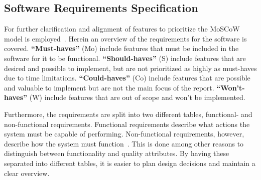 \subsection{Software Requirements Specification}\label{subsec:software-requirements-specification}

For further clarification and alignment of features to prioritize the MoSCoW model is employed~\cite{hudaib2018}.
Herein an overview of the requirements for the software is covered.
\textbf{``Must-haves''} (Mo) include features that must be included in the software for it to be functional.
\textbf{``Should-haves''} (S) include features that are desired and possible to implement, but are not prioritized as
highly as must-haves due to time limitations.
\textbf{``Could-haves''} (Co) include features that are possible and valuable to implement but are not the main
focus of the report.
\textbf{``Won't-haves''} (W) include features that are out of scope and won't be implemented.

Furthermore, the requirements are split into two different tables, functional- and non-functional requirements.
Functional requirements describe what actions the system must be capable of performing.
Non-functional requirements, however, describe how the system must function~\cite{benyon2019}.
This is done among other reasons to distinguish between functionality and quality attributes.
By having these separated into different tables, it is easier to plan design decisions and maintain a clear overview.


